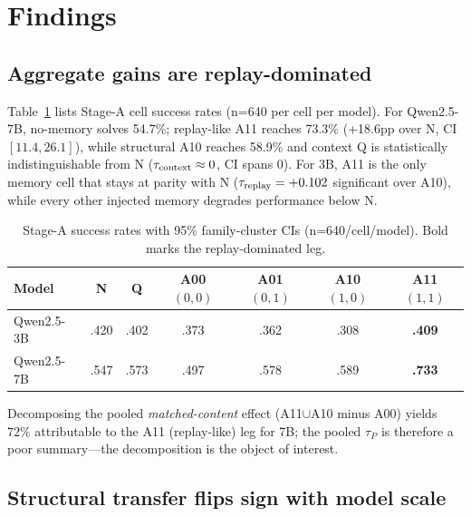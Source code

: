 \section{Findings}
\label{sec:findings}

\subsection{Aggregate gains are replay-dominated}
\label{ssec:replay}

Table~\ref{tab:rates} lists Stage-A cell success rates (n=640 per cell per model). For Qwen2.5-7B, no-memory solves 54.7\%; replay-like A11 reaches 73.3\% (+18.6pp over N, CI $[11.4, 26.1]$), while structural A10 reaches 58.9\% and context Q is statistically indistinguishable from N ($\tau_{\mathrm{context}}\approx0$, CI spans 0). For 3B, A11 is the only memory cell that stays at parity with N ($\tau_{\mathrm{replay}}=+0.102$ significant over A10), while every other injected memory degrades performance below N.

\begin{table}[t]
\centering\small
\caption{Stage-A success rates with 95\% family-cluster CIs (n=640/cell/model). Bold marks the replay-dominated leg.}
\label{tab:rates}
\begin{tabular}{lcccccc}
\toprule
Model & N & Q & A00 $(0,0)$ & A01 $(0,1)$ & A10 $(1,0)$ & A11 $(1,1)$ \\
\midrule
Qwen2.5-3B     & .420 & .402 & .373 & .362 & .308 & \textbf{.409} \\
Qwen2.5-7B     & .547 & .573 & .497 & .578 & .589 & \textbf{.733} \\
\bottomrule
\end{tabular}
\end{table}

Decomposing the pooled \emph{matched-content} effect (A11$\cup$A10 minus A00) yields $72\%$ attributable to the A11 (replay-like) leg for 7B; the pooled $\tau_P$ is therefore a poor summary---the decomposition is the object of interest.

\subsection{Structural transfer flips sign with model scale}
\label{ssec:scale}

